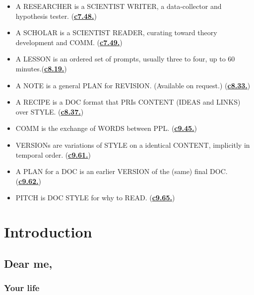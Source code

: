 \documentclass[
]{book}
\begin{document}
\begin{itemize}
\item
  A RESEARCHER is a SCIENTIST WRITER, a data-collector and hypothesis tester. (\protect\hyperlink{role-scientist}{\textbf{c7.48.}})\\
\item
  A SCHOLAR is a SCIENTIST READER, curating toward theory development and COMM. (\protect\hyperlink{role-scientist}{\textbf{c7.49.}})\\
\item
  A LESSON is an ordered set of prompts, usually three to four, up to 60 minutes.(\protect\hyperlink{lessons-1}{\textbf{c8.19.}})\\
\item
  A NOTE is a general PLAN for REVISION. (Available on request.) (\protect\hyperlink{notes-and-peers}{\textbf{c8.33.}})\\
\item
  A RECIPE is a DOC format that PRIs CONTENT (IDEAS and LINKS) over STYLE. (\protect\hyperlink{doc-types}{\textbf{c8.37.}})\\
\item
  COMM is the exchange of WORDS between PPL. (\protect\hyperlink{style}{\textbf{c9.45.}})\\
\item
  VERSIONs are variations of STYLE on a identical CONTENT, implicitly in temporal order. (\protect\hyperlink{pris-differ}{\textbf{c9.61.}})\\
\item
  A PLAN for a DOC is an earlier VERSION of the (same) final DOC. (\protect\hyperlink{pris-differ}{\textbf{c9.62.}})\\
\item
  PITCH is DOC STYLE for why to READ. (\protect\hyperlink{norms-style}{\textbf{c9.65.}})
\end{itemize}

\hypertarget{introduction}{%
\chapter{Introduction}\label{introduction}}

\hypertarget{dear-me}{%
\section{Dear me,}\label{dear-me}}

\hypertarget{your-life}{%
\subsection{Your life}\label{your-life}}
\end{document}
